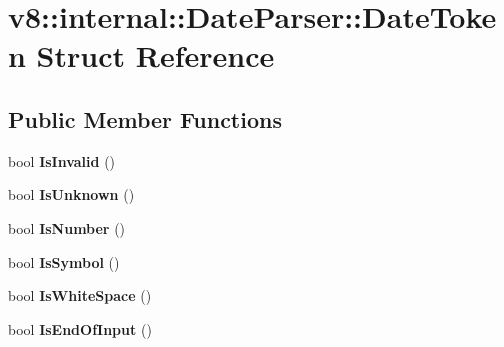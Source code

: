 \hypertarget{structv8_1_1internal_1_1_date_parser_1_1_date_token}{}\section{v8\+:\+:internal\+:\+:Date\+Parser\+:\+:Date\+Token Struct Reference}
\label{structv8_1_1internal_1_1_date_parser_1_1_date_token}
\subsection*{Public Member Functions}
\begin{DoxyCompactItemize}
\item 
bool {\bfseries Is\+Invalid} ()\hypertarget{structv8_1_1internal_1_1_date_parser_1_1_date_token_afa81b9899d60a22257fc320793ea506e}{}\label{structv8_1_1internal_1_1_date_parser_1_1_date_token_afa81b9899d60a22257fc320793ea506e}

\item 
bool {\bfseries Is\+Unknown} ()\hypertarget{structv8_1_1internal_1_1_date_parser_1_1_date_token_adc846488746db45670198cb4e6335c40}{}\label{structv8_1_1internal_1_1_date_parser_1_1_date_token_adc846488746db45670198cb4e6335c40}

\item 
bool {\bfseries Is\+Number} ()\hypertarget{structv8_1_1internal_1_1_date_parser_1_1_date_token_a88cd639802e82e4299cb58b916127878}{}\label{structv8_1_1internal_1_1_date_parser_1_1_date_token_a88cd639802e82e4299cb58b916127878}

\item 
bool {\bfseries Is\+Symbol} ()\hypertarget{structv8_1_1internal_1_1_date_parser_1_1_date_token_aae3a9df1bee869cb14dbb3e157448c3d}{}\label{structv8_1_1internal_1_1_date_parser_1_1_date_token_aae3a9df1bee869cb14dbb3e157448c3d}

\item 
bool {\bfseries Is\+White\+Space} ()\hypertarget{structv8_1_1internal_1_1_date_parser_1_1_date_token_a91912027bec64a983b0d447b33b026b4}{}\label{structv8_1_1internal_1_1_date_parser_1_1_date_token_a91912027bec64a983b0d447b33b026b4}

\item 
bool {\bfseries Is\+End\+Of\+Input} ()\hypertarget{structv8_1_1internal_1_1_date_parser_1_1_date_token_a6ef74b3b653e3b077d997edf1c964777}{}\label{structv8_1_1internal_1_1_date_parser_1_1_date_token_a6ef74b3b653e3b077d997edf1c964777}


\end{DoxyCompactItemize}
